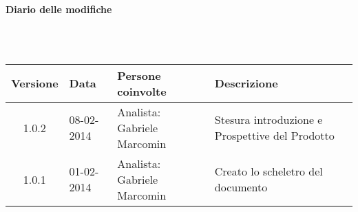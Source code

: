 \noindent\begin{Large}\textbf{Diario delle modifiche}\end{Large}\\
\\
\begin{small}
\begin{tabular}{|c|p{1.7cm}|p{2.8cm}|p{7cm}|}
\hline
Versione & Data & Persone coinvolte & Descrizione \\
\hline
1.0.2 & 08-02-2014 & Analista: Gabriele Marcomin & Stesura introduzione e Prospettive del Prodotto\\
\hline
1.0.1 & 01-02-2014 & Analista: Gabriele Marcomin & Creato lo scheletro del documento\\
\hline
\end{tabular}\\
\end{small}
